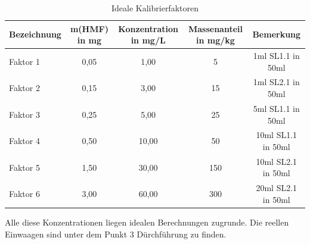 \begin{table}[htbp]
	\centering
		\begin{tabular}{l|c|c|c|c}
			Bezeichnung & m(HMF) in mg & Konzentration in mg/L & Massenanteil in mg/kg & Bemerkung\\
			\hline
			Faktor 1 & 0,05 & 1,00  & 5 & 1ml SL1.1 in 50ml\\
			\hline
			Faktor 2 & 0,15 & 3,00  & 15 & 1ml SL2.1 in 50ml\\
			\hline
			Faktor 3 & 0,25 & 5,00  & 25 & 5ml SL1.1 in 50ml\\
			\hline
			Faktor 4 & 0,50 & 10,00 & 50 & 10ml SL1.1 in 50ml\\
			\hline
			Faktor 5 & 1,50 & 30,00 & 150 & 10ml SL2.1 in 50ml\\
			\hline
			Faktor 6 & 3,00 & 60,00 & 300 & 20ml SL2.1 in 50ml\\
		\end{tabular}
	\caption{Ideale Kalibrierfaktoren}
	\label{tab:IdealeKalibrierfaktoren}
\end{table}

Alle diese Konzentrationen liegen idealen Berechnungen zugrunde. Die reellen Einwaagen sind unter dem Punkt 3 Dürchführung zu finden.
